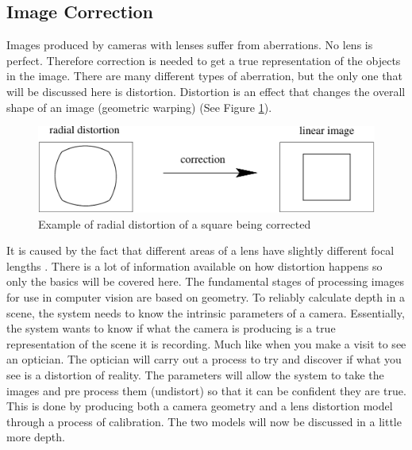 \documentclass[11pt,oneside]{report}
\begin{document}
				\subsection{Image Correction}
				Images produced by cameras with lenses suffer from aberrations.
				No lens is perfect.
				Therefore correction is needed to get a true representation of the objects in the image.
				There are many different types of aberration, but the only one that will be discussed here is distortion.
				Distortion is an effect that changes the overall shape of an image (geometric warping) (See Figure \ref{fig:distortion}).
				\begin{figure}[!h]
				\centering
					
    					\includegraphics[width=\textwidth]{distortion_1}
    					\caption{Example of radial distortion of a square being corrected \protect\cite{book:multiViewGeo} {\label{fig:distortion}}}

				\end{figure}				
				It is caused by the fact that different areas of a lens have slightly different focal lengths \cite[p. 42]{book:modern}.
				There is a lot of information available on how distortion happens so only the basics will be covered here. %
				The fundamental stages of processing images for use in computer vision are based on geometry.
				To reliably calculate depth in a scene, the system needs to know the intrinsic %
				parameters of a camera.
				Essentially, the system wants to know if what the camera is producing is a true representation of the scene it is recording.
				Much like when you make a visit to see an optician. 
				The optician will carry out a process to try and discover if what you see is a distortion of reality.
				The parameters will allow the system to take the images and pre process them (undistort) so that it can be confident they are true.
				This is done by producing both a camera geometry and a lens distortion model through a process of calibration.  
				The two models will now be discussed in a little more depth.				
\end{document}
